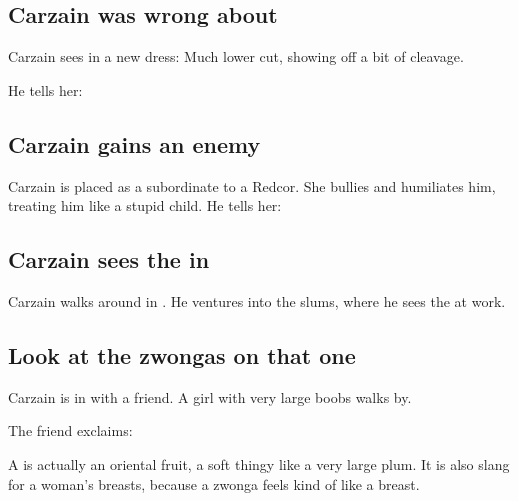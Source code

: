 \begin{garbage}
\subsection{Carzain was wrong about \Esmerel}
Carzain sees \Esmerel{} in a new dress: Much lower cut, showing off a bit of cleavage. 

He tells her: 









\subsection{Carzain gains an enemy}
Carzain is placed as a subordinate to a Redcor. She bullies and humiliates him, treating him like a stupid child. He tells her:  









\subsection{Carzain sees the \Morbus{} in \Redce}
Carzain walks around in \Redce. He ventures into the slums, where he sees the \hs{\Morbus} at work.







\subsection{Look at the zwongas on that one}
Carzain is in \Redce{} with a friend. 
A girl with very large boobs walks by. 

The friend exclaims: 

A  is actually an oriental fruit, a soft thingy like a very large plum. 
It is also slang for a woman's breasts, because a zwonga feels kind of like a breast. 










\end{garbage}
